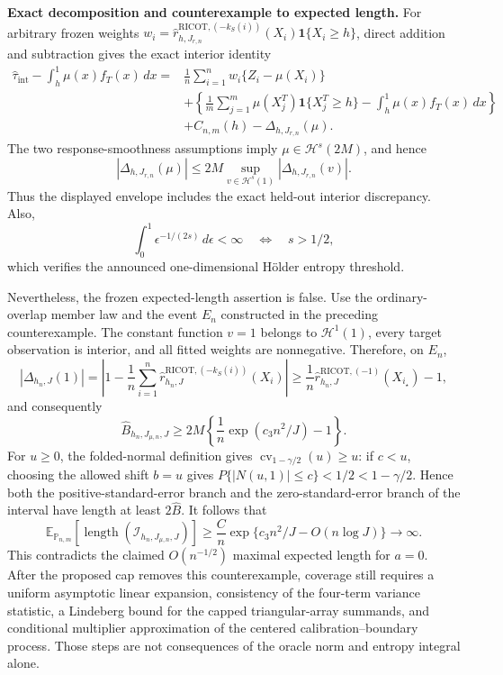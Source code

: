 \textbf{Exact decomposition and counterexample to expected length.}
For arbitrary frozen weights \(w_i=\widehat r^{\mathrm{RICOT},(-k_S(i))}_{h,J_{r,n}}(X_i)\mathbf 1\{X_i\ge h\}\), direct addition and subtraction gives the exact interior identity
\[
\begin{aligned}
\widehat\tau_{\mathrm{int}}-\int_h^1\mu(x)f_T(x)\,dx
={}&\frac1n\sum_{i=1}^nw_i\{Z_i-\mu(X_i)\}\\
&+\left\{\frac1m\sum_{j=1}^m\mu(X_j^T)\mathbf 1\{X_j^T\ge h\}-\int_h^1\mu(x)f_T(x)\,dx\right\}\\
&+C_{n,m}(h)-\Delta_{h,J_{r,n}}(\mu).
\end{aligned}
\]
The two response-smoothness assumptions imply \(\mu\in\mathcal H^s(2M)\), and hence
\[
 |\Delta_{h,J_{r,n}}(\mu)|\le2M\sup_{v\in\mathcal H^s(1)}|\Delta_{h,J_{r,n}}(v)|.
\]
Thus the displayed envelope includes the exact held-out interior discrepancy. Also,
\[
 \int_0^1\epsilon^{-1/(2s)}\,d\epsilon<\infty
 \quad\Longleftrightarrow\quad s>1/2,
\]
which verifies the announced one-dimensional Hölder entropy threshold.

Nevertheless, the frozen expected-length assertion is false. Use the ordinary-overlap member law and the event \(E_n\) constructed in the preceding counterexample. The constant function \(v=1\) belongs to \(\mathcal H^1(1)\), every target observation is interior, and all fitted weights are nonnegative. Therefore, on \(E_n\),
\[
 |\Delta_{h_n,J}(1)|
 =\left|1-\frac1n\sum_{i=1}^n\widehat r^{\mathrm{RICOT},(-k_S(i))}_{h_n,J}(X_i)\right|
 \ge \frac1n\widehat r^{\mathrm{RICOT},(-1)}_{h_n,J}(X_{i_\star})-1,
\]
and consequently
\[
 \widehat B_{h_n,J_{\mu,n},J}
 \ge2M\left\{\frac1n\exp(c_3n^2/J)-1\right\}.
\]
For \(u\ge0\), the folded-normal definition gives \(\operatorname{cv}_{1-\gamma/2}(u)\ge u\): if \(c<u\), choosing the allowed shift \(b=u\) gives \(P\{|N(u,1)|\le c\}<1/2<1-\gamma/2\). Hence both the positive-standard-error branch and the zero-standard-error branch of the interval have length at least \(2\widehat B\). It follows that
\[
 \mathbb E_{\mathbb P_{n,m}}[\operatorname{length}(\mathcal I_{h_n,J_{\mu,n},J})]
 \ge \frac{C}{n}\exp\{c_3n^2/J-O(n\log J)\}\longrightarrow\infty.
\]
This contradicts the claimed \(O(n^{-1/2})\) maximal expected length for \(a=0\). After the proposed cap removes this counterexample, coverage still requires a uniform asymptotic linear expansion, consistency of the four-term variance statistic, a Lindeberg bound for the capped triangular-array summands, and conditional multiplier approximation of the centered calibration--boundary process. Those steps are not consequences of the oracle norm and entropy integral alone.